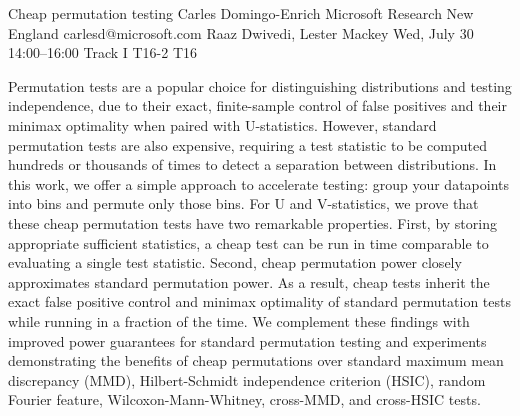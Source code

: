 \begin{talk}
  {Cheap permutation testing}%
  {Carles Domingo-Enrich}%
  {Microsoft Research New England}%
  {carlesd@microsoft.com}%
  {Raaz Dwivedi, Lester Mackey}%
  {}%
  {Wed, July 30 14:00–16:00 Track I}%
  {T16-2}%
  {T16}%
  
				
			
Permutation tests are a popular choice for distinguishing distributions and testing independence, due to their exact, finite-sample control of false positives and their minimax optimality when paired with U-statistics. However, standard permutation tests are also expensive, requiring a test statistic to be computed hundreds or thousands of times to detect a separation between distributions. In this work, we offer a simple approach to accelerate testing: group your datapoints into bins and permute only those bins. For U and V-statistics, we prove that these cheap permutation tests have two remarkable properties. First, by storing appropriate sufficient statistics, a cheap test can be run in time comparable to evaluating a single test statistic. Second, cheap permutation power closely approximates standard permutation power. As a result, cheap tests inherit the exact false positive control and minimax optimality of standard permutation tests while running in a fraction of the time. We complement these findings with improved power guarantees for standard permutation testing and experiments demonstrating the benefits of cheap permutations over standard maximum mean discrepancy (MMD), Hilbert-Schmidt independence criterion (HSIC), random Fourier feature, Wilcoxon-Mann-Whitney, cross-MMD, and cross-HSIC tests.



\end{talk}

